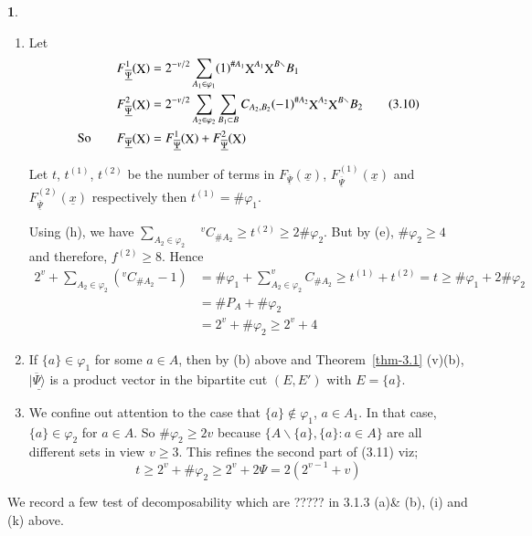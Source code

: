 \documentclass[a4paper,12pt]{article}
\DeclareMathOperator{\x}{\mathrm{X}}
\theoremstyle{definition}
\theoremstyle{underlinethm}
\theoremstyle{definition}
\newtheorem{subsubsec}{}[subsection]
\begin{document}
\begin{subsubsec}
\begin{enumerate}[label=(\alph*)]
\item Let 
\begin{align*}
F^{1}_{\underline{\overline{\Psi}}}(\bold{\x})  &= 2^{-v/2} \sum_{A_{1} \in \varphi_{1}}(1)^{\# A_{1}} \bold{\x}^{A_{1}} \bold{\x}^{B\smallsetminus} B_{1}\\
F^{2}_{\underline{\overline{\Psi}}}(\bold{\x})  &= 2^{-v/2} \sum_{A_{2} \in \varphi_{2}} \sum_{B_{1} \subset B} C_{A_{2}, B_{2}}(-1)^{\# A_{2}} \bold{\x}^{A_{2}} \bold{\x}^{B\smallsetminus}B_{2}\tag{3.10}\label{eq-3.10}\\
\text{So}\quad\quad F_{\underline{\overline{\Psi}}} (\bold{\x}) &= F^{1}_{\underline{\overline{\Psi}}} (\bold{\x}) + F^{2}_{\underline{\overline{\Psi}}} (\bold{\x})
\end{align*}

Let $t$, $t^{(1)}$, $t^{(2)}$ be the number of terms in $F_{\underline{\overline{\Psi}}}(\underline{x})$, $F^{(1)}_{\underline{\overline{\Psi}}}(\underline{x})$ and $F^{(2)}_{\underline{\overline{\Psi}}}(\underline{x})$ respectively then $t^{(1)} = \# \varphi_{1}$.

Using (h), we have $\sum_{A_{2} \in \varphi_{2}} \quad ^{v}C_{\# A_{2}} \geq t^{(2)} \geq 2 \# \varphi_{2}$. But by (e), $\# \varphi_{2} \geq 4$  and therefore, $f^{(2)} \geq 8$. Hence 
\begin{align*}
2^ {v} + \sum_{A_{2} \in \varphi_{2}}(^{v}C_{\# A_{2}}-1) &= \# \varphi_{1} + \sum_{A_{2} \in \varphi_{2}} ^{v}C_{\# A_{2}} \geq t^{(1)} + t^{(2)} = t \geq \# \varphi_{1} + 2 \# \varphi_{2}  \\[-.1cm]
 & = \#P_{A} + \# \varphi_{2}\\
& = 2^{v} + \# \varphi_{2} \geq 2^{v} + 4 \tag{3.11}  
\end{align*}

\item If $\{a\} \in \varphi_{1}$ for some $a\in A$, then by (b) above and Theorem~\eqref{thm-3.1} (v)(b), $|\underline{\overline{\Psi} \rangle}$ is a product vector in the bipartite cut $(E, E')$ with $E= \{a\}$.

\item We confine out attention to the case that $\{a\} \notin \varphi_{1}$, $a\in A_{1}$. In that case, $\{a\} \in \varphi_{2}$ for $a\in A$. So $\# \varphi_{2} \geq 2v$ because $\{A \smallsetminus \{a\}, \{a\} : a \in A \}$ are all different sets in view $v \geq 3$. This refines the second part of (3.11) viz; 
\begin{equation*}
t \geq 2^{v} + \# \varphi_{2} \geq 2^{v} + 2 \Psi = 2(2^{v-1} + v)\tag{3.12} 
\end{equation*} 

\end{enumerate}

We record a few test of decomposability which are ????? in 3.1.3 (a)\& (b), (i) and (k) above.

\end{subsubsec}
\end{document}
